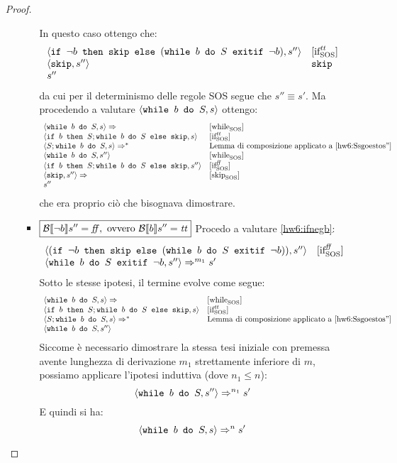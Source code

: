 \begin{enumerate}
\begin{proof}
\begin{itemize}
\begin{itemize}
		In questo caso ottengo che:
		$$
		\begin{array}{ll}
		\confSs{\ifABC{\neg b}{\skipForFriends}{(\wbSE{b}{S}{\neg b})}}{s''} & \ifttSOS \\
		\confSs{\skipForFriends}{s''} & \skipForFriends \\
		s''
		\end{array}
		$$
		da cui per il determinismo delle regole SOS segue che $\boxed{s'' \equiv s'}$. Ma procedendo
		a valutare $\confSs{\wbS{b}{S}}{s}$ ottengo:
		$$
		\begin{array}{ll}
		\confSs{\wbS{b}{S}}{s} \Rar{} & \whileSOS \\
		\confSs{\ifABC{b}{S; \wbS{b}{S}}{\skipForFriends}}{s} & \ifttSOS \\
		\confSs{S; \wbS{b}{S}}{s} \Rar{*} & \text{Lemma di composizione applicato a \ref{hw6:Ssgoestos''}} \\
		\confSs{\wbS{b}{S}}{s''} & \whileSOS \\
		\confSs{\ifABC{b}{S; \wbS{b}{S}}{\skipForFriends}}{s''} & \ifffSOS \\
		\confSs{\skipForFriends}{s''} \Rar{} & \skipSOS \\
		s''
		\end{array}
		$$
		che era proprio ciò che bisognava dimostrare.
		\item $\boxed{\B{\neg b}'' = \semfalse, \text{ ovvero } \B{b}'' = \semtrue}$
		Procedo a valutare \ref{hw6:ifnegb}:
		$$
		\begin{array}{ll}
		\confSs{(\ifABC{\neg b}{\skipForFriends}{(\wbSE{b}{S}{\neg b})})}{s''} & \ifffSOS\\
		\confSs{\wbSE{b}{S}{\neg b}}{s''} \Rar{m_1} s'
		\end{array}
		$$
    Sotto le stesse ipotesi, il termine  evolve come
    segue:
    $$
    \begin{array}{ll}
    \confSs{\wbS{b}{S}}{s} \Rar{} & \whileSOS \\
    \confSs{\ifABC{b}{S; \wbS{b}{S}}{\skipForFriends}}{s} & \ifttSOS \\
    \confSs{S; \wbS{b}{S}}{s} \Rar{*} & \text{Lemma di composizione applicato a \ref{hw6:Ssgoestos''}} \\
    \confSs{\wbS{b}{S}}{s''}
    \end{array}
    $$
		Siccome è necessario dimostrare la stessa tesi iniziale con premessa avente
    lunghezza di derivazione $m_1$ strettamente inferiore di $m$, possiamo
    applicare l'ipotesi induttiva (dove $n_1 \leq n$):
		$$
		\confSs{\wbS{b}{S}}{s''} \Rar{n_1} s'
		$$
    E quindi si ha:
    $$
    \confSs{\wbS{b}{S}}{s} \Rar{n} s'
    $$
	\end{itemize}
	

\end{itemize}
\end{proof}
\end{enumerate}
